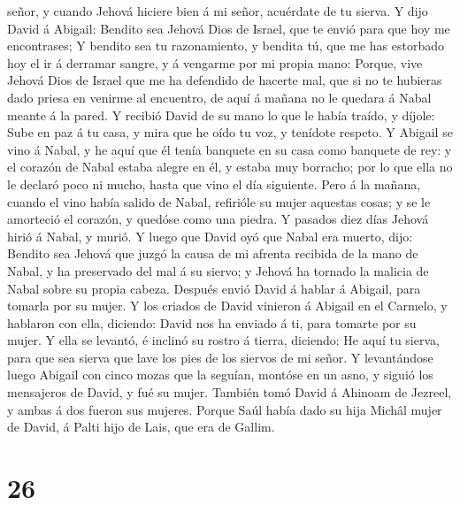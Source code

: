 señor, y cuando Jehová hiciere bien á mi señor, acuérdate de tu sierva.
 Y dijo David á Abigail: Bendito sea Jehová Dios de Israel,
que te envió para que hoy me encontrases;  Y bendito sea tu
razonamiento, y bendita tú, que me has estorbado hoy el ir á derramar
sangre, y á vengarme por mi propia mano:  Porque, vive
Jehová Dios de Israel que me ha defendido de hacerte mal, que si no te
hubieras dado priesa en venirme al encuentro, de aquí á mañana no le
quedara á Nabal meante á la pared.  Y recibió David de su
mano lo que le había traído, y díjole: Sube en paz á tu casa, y mira que
he oído tu voz, y tenídote respeto.  Y Abigail se vino á
Nabal, y he aquí que él tenía banquete en su casa como banquete de rey:
y el corazón de Nabal estaba alegre en él, y estaba muy borracho; por lo
que ella no le declaró poco ni mucho, hasta que vino el día siguiente.
 Pero á la mañana, cuando el vino había salido de Nabal,
refirióle su mujer aquestas cosas; y se le amorteció el corazón, y
quedóse como una piedra.  Y pasados diez días Jehová hirió
á Nabal, y murió.  Y luego que David oyó que Nabal era
muerto, dijo: Bendito sea Jehová que juzgó la causa de mi afrenta
recibida de la mano de Nabal, y ha preservado del mal á su siervo; y
Jehová ha tornado la malicia de Nabal sobre su propia cabeza. Después
envió David á hablar á Abigail, para tomarla por su mujer. 
Y los criados de David vinieron á Abigail en el Carmelo, y hablaron con
ella, diciendo: David nos ha enviado á ti, para tomarte por su mujer.
 Y ella se levantó, é inclinó su rostro á tierra, diciendo:
He aquí tu sierva, para que sea sierva que lave los pies de los siervos
de mi señor.  Y levantándose luego Abigail con cinco mozas
que la seguían, montóse en un asno, y siguió los mensajeros de David, y
fué su mujer.  También tomó David á Ahinoam de Jezreel, y
ambas á dos fueron sus mujeres.  Porque Saúl había dado su
hija Michâl mujer de David, á Palti hijo de Lais, que era de Gallim.

\hypertarget{section-25}{%
\section{26}\label{section-25}}

